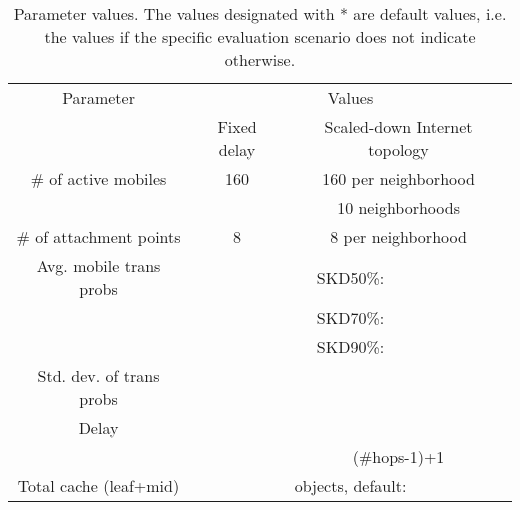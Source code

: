 \documentclass[conference]{IEEEtran}
\newcommand{\mynotex}[1]{}
\begin{document}
\mynotex{\begin{itemize}
\item fixed delay: 10 runs for fixed delay.
\item Internet topology: 10 runs for each neighborhood.
\item each run has duration 10000 handoffs
\item 95\% confidence interval, less than 5\% for all results except 30\% variation of transition probabilities.
\item naive and oracle influences very little by transition probabilities, hence we do not show different results.
\item how long is each run? how many runs do we take for average. conf interval?
\end{itemize}
}

\begin{table}[t]
\caption{Parameter values. The values designated with * are default values, i.e. the values if the specific evaluation scenario does not indicate otherwise.}
    \label{tab:values}
\centering
 {\scriptsize
        \begin{tabular}{|c|c|c|}
        \hline
        Parameter  &  \multicolumn{2}{c|}{Values} \\ \cline{2-3}
                   &  Fixed delay & Scaled-down Internet topology\\
        \hline \hline
   \# of active mobiles      &  160 & 160 per neighborhood \\
                             &      &  10 neighborhoods \\ \hline
   \# of attachment points &  8  & 8 per neighborhood \\ \hline
   Avg. mobile trans probs & \multicolumn{2}{c|}{SKD50\%: } \\
     & \multicolumn{2}{c|}{SKD70\%: } \\
     & \multicolumn{2}{c|}{SKD90\%: } \\ \hline
  Std. dev. of trans probs & \multicolumn{2}{c|}{} \\ \hline
  Delay &    &  \\
        &  & (\#hops-1)+1 \\ \hline
  Total cache (leaf+mid) & \multicolumn{2}{c|}{ objects, default:} \\
        \hline
        \end{tabular}
        }
\vspace{-0.05in}
\end{table}
\end{document}
